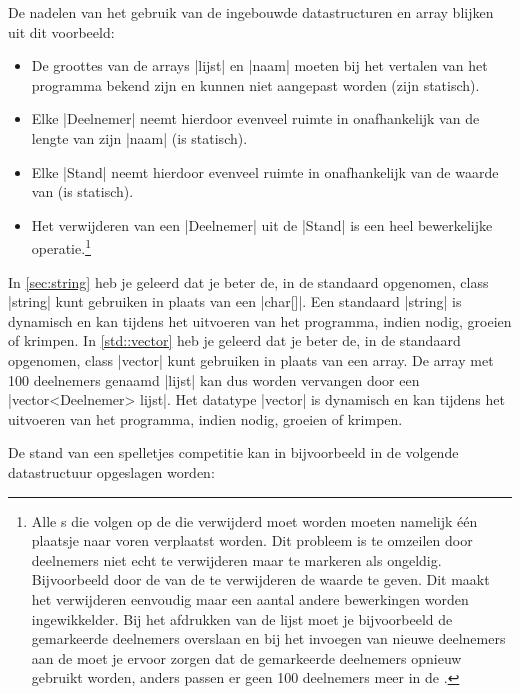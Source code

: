 \begin{cpplstShortInline}
De nadelen van het gebruik van de ingebouwde datastructuren  en array blijken uit dit voorbeeld:
\begin{itemize}
	\item De groottes van de arrays |lijst| en |naam| moeten bij het vertalen van het programma bekend zijn en kunnen niet aangepast worden (zijn statisch).
	\item Elke |Deelnemer| neemt hierdoor evenveel ruimte in onafhankelijk van de lengte van zijn |naam| (is statisch).
	\item Elke |Stand| neemt hierdoor evenveel ruimte in onafhankelijk van de waarde van  (is statisch).
	\item Het verwijderen van een |Deelnemer| uit de |Stand| is een heel bewerkelijke operatie.\footnote{%
		Alle s die volgen op de  die verwijderd moet worden moeten namelijk één plaatsje naar voren verplaatst worden.
		Dit probleem is te omzeilen door deelnemers niet echt te verwijderen maar te markeren als ongeldig.
		Bijvoorbeeld door de  van de te verwijderen  de waarde  te geven.
		Dit maakt het verwijderen eenvoudig maar een aantal andere bewerkingen worden ingewikkelder.
		Bij het afdrukken van de lijst moet je bijvoorbeeld de gemarkeerde deelnemers overslaan en bij het invoegen van nieuwe deelnemers aan de  moet je ervoor zorgen dat de gemarkeerde deelnemers opnieuw gebruikt worden, anders passen er geen 100 deelnemers meer in de .
	}
\end{itemize}

In \cref{sec:string} heb je geleerd dat je beter de, in de standaard \Cpp{}  opgenomen, class |string| kunt gebruiken in plaats van een |char[]|.
Een \Cpp{} standaard |string| is dynamisch en kan tijdens het uitvoeren van het programma, indien nodig, groeien of krimpen.
In \cref{std::vector} heb je geleerd dat je beter de, in de standaard \Cpp{}  opgenomen, class |vector| kunt gebruiken in plaats van een array.
De array met 100 deelnemers genaamd |lijst| kan dus worden vervangen door een |vector<Deelnemer> lijst|.
Het datatype |vector| is dynamisch en kan tijdens het uitvoeren van het programma, indien nodig, groeien of krimpen.

De stand van een spelletjes competitie kan in \Cpp{} bijvoorbeeld in de volgende datastructuur opgeslagen
worden:


\end{cpplstShortInline}
